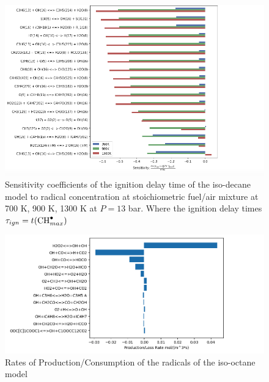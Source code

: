 \begin{figure}
    \centering
    \includegraphics[scale=0.45, keepaspectratio]{images/sensitivity-iso-octane.png}
    \caption{Sensitivity coefficients of the ignition delay time of the iso-decane model to  radical concentration at stoichiometric fuel/air mixture at 700 K, 900 K, 1300 K at $P=13$ bar. Where the ignition delay times $\tau_{ign}=t(\ce{CH^.}_{max})$}
    \label{fig:ic8-sensitivity}
\end{figure}


\begin{figure}
    \centering
    \includegraphics[scale=0.45, keepaspectratio]{images/ic8-ROP.png}
    \caption{Rates of Production/Consumption of the  radicals of the iso-octane model}
    \label{fig:rop-nc10}
\end{figure}